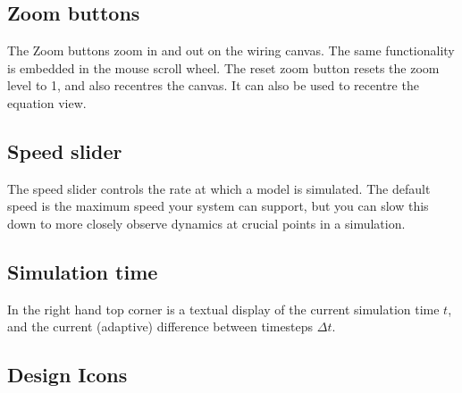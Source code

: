 %
%
%
%
%
%
%

\subsection{Zoom buttons}
\label{ZoomButtons}


The Zoom buttons zoom in and out on the wiring canvas. The same functionality
is embedded in the mouse scroll wheel. The reset zoom button
 resets the zoom level to 1, and also
recentres the canvas. It can also be used to recentre the equation view.

\subsection{Speed slider}
\label{Speedslider}


The speed slider controls the rate at which a model is simulated. The
default speed is the maximum speed your system can support, but you
can slow this down to more closely observe dynamics at crucial points
in a simulation.

\subsection{Simulation time}
\label{SimTime}

In the right hand top corner is a textual display of the current
simulation time $t$, and the current (adaptive) difference between
timesteps $\Delta t$.

\subsection{Design Icons}

